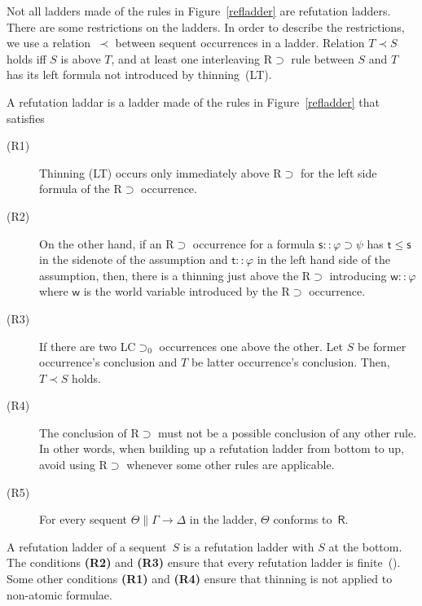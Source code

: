   Not all ladders made of the rules in Figure~\ref{refladder} are
  refutation ladders.
  There are some restrictions on the ladders.
  In order to describe the restrictions,
  we use a relation~$\prec$ between sequent occurrences in a ladder.
  Relation $T\prec S$ holds iff
  $S$ is above $T$, and
  at least one interleaving \textrm{R$\supset$} rule between $S$ and $T$
  has its left formula not introduced by thinning~(LT).
  \begin{definition}
   A refutation laddar is a ladder made of the rules in
   Figure~\ref{refladder} that satisfies
   \begin{description}
    \item[ (R1)] Thinning \textrm{(LT)} occurs only immediately above \textrm{R$\supset$} for the
	 left side formula of the \textrm{R$\supset$} occurrence.
    \item[ (R2)]
	 On the other hand, if an \textrm{R$\supset$} occurrence
	 for a formula
	 $\mathsf s::\varphi\supset\psi$ has $\mathsf t\le \mathsf s$
	 in the sidenote of the assumption and
	 $\mathsf t::\varphi$ in the left hand side of the assumption,
	 then,
	 there is a thinning just above the R$\supset$ introducing
	 $\mathsf w::\varphi$ where $\mathsf w$ is the world variable
	 introduced by the \textrm{R$\supset$} occurrence.
    \item[ (R3)]
	 If there are two \textrm{LC$\supset_0$} occurrences one above the
	 other.
	 Let $S$ be former occurrence's conclusion and $T$ be latter occurrence's
	 conclusion.
	 Then, $T\prec S$ holds.
    \item[ (R4)]
	 The conclusion of \textrm{R$\supset$} must not be a
	 possible conclusion of any other rule.
	 In other words, when building up a refutation ladder from
	 bottom to up, avoid using R$\supset$ whenever some other
	 rules are applicable.
    \item[ (R5)]
	 For every sequent $\Theta\parallel \Gamma\rightarrow\Delta$
	 in the ladder, $\Theta$ conforms to~$\mathsf R$.
   \end{description}
  \end{definition}
  A refutation ladder of a sequent~$S$ is a refutation ladder
  with
  $S$ at the bottom.
  The conditions \textbf{(R2)} and \textbf{(R3)} ensure that every
  refutation ladder is finite~().
  Some other conditions \textbf{(R1)} and \textbf{(R4)} ensure
  that thinning is not applied to non-atomic formulae.


